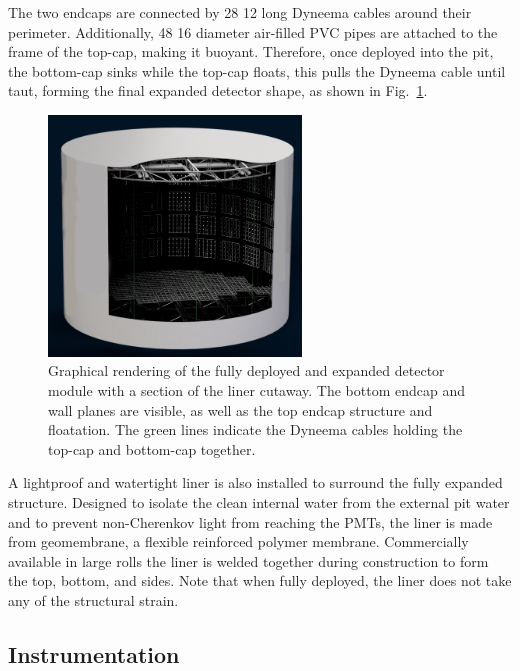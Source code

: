 The two endcaps are connected by 28 \unit{12}{} long Dyneema cables around their
perimeter. Additionally, 48 \unit{16}{} diameter air-filled PVC pipes are attached to
the frame of the top-cap, making it buoyant. Therefore, once deployed into the pit, the bottom-cap
sinks while the top-cap floats, this pulls the Dyneema cable until taut, forming the final
expanded detector shape, as shown in Fig.~\ref{fig:chips_render}.

\begin{figure} %
    \includegraphics[width=0.6\textwidth]{diagrams/4-chips/chips_render_1.png}
    \caption[Graphical rendering of the \chipsfive detector.]
    {Graphical rendering of the fully deployed and expanded \chipsfive detector module with a
        section of the liner cutaway. The bottom endcap and wall planes are visible, as well as
        the top endcap structure and floatation. The green lines indicate the Dyneema cables
        holding the top-cap and bottom-cap together.}
    \label{fig:chips_render}
\end{figure}

A lightproof and watertight liner is also installed to surround the fully expanded structure.
Designed to isolate the clean internal water from the external pit water and to prevent
non-Cherenkov light from reaching the PMTs, the liner is made from geomembrane, a flexible
reinforced polymer membrane. Commercially available in large rolls the liner is welded together
during construction to form the top, bottom, and sides. Note that when fully deployed, the liner
does not take any of the structural strain.

\subsection{Instrumentation} %
\label{sec:chips_detector_instrumentation} %


